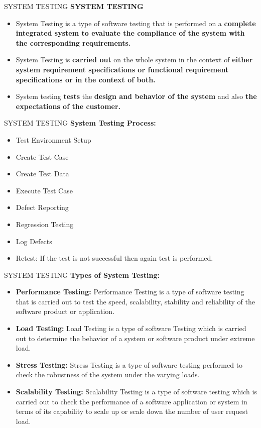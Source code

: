 \documentclass{beamer}
\begin{document}
\begin{frame}{SYSTEM TESTING}
	\textbf{SYSTEM TESTING}
	\begin{itemize}
		\item System Testing is a type of software testing that is performed on a\textbf{ complete integrated system to evaluate the compliance of the system with the corresponding requirements. }
		\item System Testing is\textbf{ carried out} on the whole system in the context of\textbf{ either system requirement specifications or functional requirement specifications or in the context of both. }
		\item System testing\textbf{ tests }the \textbf{design and behavior of the system }and also \textbf{the expectations of the customer.} 
	\end{itemize}
\end{frame}
\begin{frame}{SYSTEM TESTING}
	\textbf{System Testing Process:}
	\begin{itemize}
		\item Test Environment Setup
		\item Create Test Case
		\item Create Test Data
		\item Execute Test Case
		\item Defect Reporting
		\item Regression Testing
		\item Log Defects
		\item Retest: If the test is not successful then again test is performed.
	\end{itemize}
\end{frame}
\begin{frame}{SYSTEM TESTING}
	\textbf{Types of System Testing:}
	\begin{itemize}
		\item \textbf{Performance Testing:} Performance Testing is a type of software testing that is carried out to test the speed, scalability, stability and reliability of the software product or application.
		\item \textbf{Load Testing:} Load Testing is a type of software Testing which is carried out to determine the behavior of a system or software product under extreme load.
		\item \textbf{Stress Testing:} Stress Testing is a type of software testing performed to check the robustness of the system under the varying loads.
		\item \textbf{Scalability Testing:} Scalability Testing is a type of software testing which is carried out to check the performance of a software application or system in terms of its capability to scale up or scale down the number of user request load.
	\end{itemize}
\end{frame}
\end{document}
